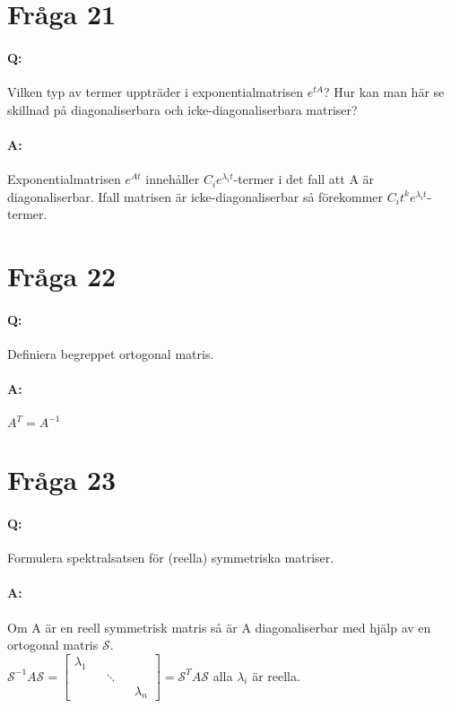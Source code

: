 \documentclass[a4paper]{article}
\begin{document}
\section{Fråga 21}
\paragraph{Q:} Vilken typ av termer uppträder i exponentialmatrisen $e^{tA}$? Hur kan man här se skillnad på diagonaliserbara och icke-diagonaliserbara matriser?
\paragraph{A:} Exponentialmatrisen $e^{At}$ innehåller $C_ie^{\lambda_it}$-termer i det fall att A är diagonaliserbar. Ifall matrisen är icke-diagonaliserbar så förekommer $C_it^ke^{\lambda_it}$-termer.

\section{Fråga 22}
\paragraph{Q:} Definiera begreppet ortogonal matris. 
\paragraph{A:} $A^T=A^{-1}$

\section{Fråga 23}
\paragraph{Q:} Formulera spektralsatsen för (reella) symmetriska matriser.
\paragraph{A:} Om A är en reell symmetrisk matris så är A diagonaliserbar med hjälp av en ortogonal matris $\mathcal{S}$.\\
{ \center $\mathcal{S}^{-1}A\mathcal{S}=\begin{bmatrix} \lambda_1 && && \\ && \ddots && \\ && && \lambda_n \end{bmatrix} = \mathcal{S}^TA\mathcal{S}$ \endcenter } alla $\lambda_i$ är reella.
\end{document}
